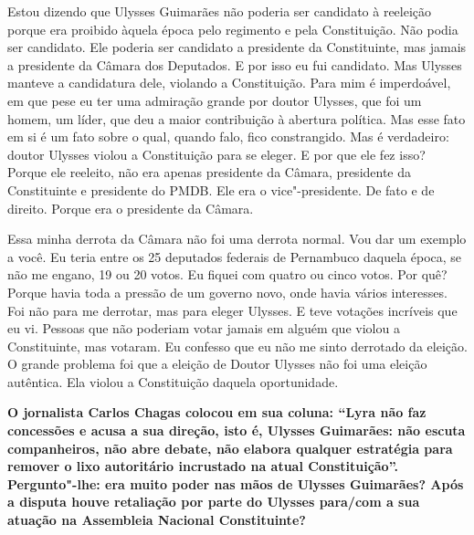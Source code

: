 Estou dizendo que Ulysses Guimarães não poderia ser candidato à
reeleição porque era proibido àquela época pelo regimento e pela
Constituição. Não podia ser candidato. Ele poderia ser candidato a
presidente da Constituinte, mas jamais a presidente da Câmara dos
Deputados. E por isso eu fui candidato. Mas Ulysses manteve a
candidatura dele, violando a Constituição. Para mim é imperdoável, em
que pese eu ter uma admiração grande por doutor Ulysses, que foi um
homem, um líder, que deu a maior contribuição à abertura política. Mas
esse fato em si é um fato sobre o qual, quando falo, fico constrangido.
Mas é verdadeiro: doutor Ulysses violou a Constituição para se eleger. E
por que ele fez isso? Porque ele reeleito, não era apenas presidente da
Câmara, presidente da Constituinte e presidente do PMDB. Ele era o
vice"-presidente. De fato e de direito. Porque era o presidente da
Câmara.

Essa minha derrota da Câmara não foi uma derrota normal. Vou dar um
exemplo a você. Eu teria entre os 25 deputados federais de Pernambuco
daquela época, se não me engano, 19 ou 20 votos. Eu fiquei com quatro ou
cinco votos. Por quê? Porque havia toda a pressão de um governo novo,
onde havia vários interesses. Foi não para me derrotar, mas para eleger
Ulysses. E teve votações incríveis que eu vi. Pessoas que não poderiam
votar jamais em alguém que violou a Constituinte, mas votaram. Eu
confesso que eu não me sinto derrotado da eleição. O grande problema foi
que a eleição de Doutor Ulysses não foi uma eleição autêntica. Ela
violou a Constituição daquela oportunidade.

\textbf{O jornalista Carlos Chagas colocou em sua coluna: ``Lyra não faz
concessões e acusa a sua direção, isto é, Ulysses Guimarães: não escuta
companheiros, não abre debate, não elabora qualquer estratégia para
remover o lixo autoritário incrustado na atual Constituição''.
Pergunto"-lhe: era muito poder nas mãos de Ulysses Guimarães? Após a
disputa houve retaliação por parte do Ulysses para/com a sua atuação na
Assembleia Nacional Constituinte?}

